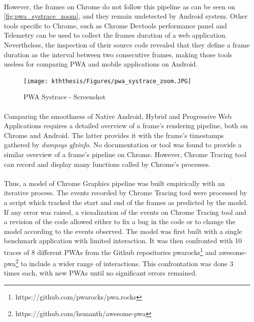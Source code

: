 \documentclass{kththesis}
\begin{document}
    \paragraph{}
    However, the frames on Chrome do not follow this pipeline as can be seen on \autoref{fig:pwa_systrace_zoom}, and they remain undetected by Android system. Other tools specific to Chrome, such as Chrome Devtools performance panel and Telemetry can be used to collect the frames duration of a web application. Nevertheless, the inspection of their source code revealed that they define a frame duration as the interval between two consecutive frames, making those tools useless for comparing PWA and mobile applications on Android.
    
    \begin{figure}
        \centering
        \texttt{[image: kththesis/Figures/pwa\_systrace\_zoom.JPG]}
        \caption{PWA Systrace - Screenshot}
        \label{fig:pwa_systrace_zoom}
    \end{figure}
    
    \paragraph{}
    Comparing the smoothness of Native Android, Hybrid and Progressive Web Applications requires a detailed overview of a frame's rendering pipeline, both on Chrome and Android. The latter provides it with the frame's timestamps gathered by \textit{dumpsys gfxinfo}. No documentation or tool was found to provide a similar overview of a frame's pipeline on Chrome. However, Chrome Tracing tool can record and display many functions called by Chrome's processes.
    
    \paragraph{}
    Thus, a model of Chrome Graphics pipeline was built empirically with an iterative process. The events recorded by Chrome Tracing tool were processed by a script which tracked the start and end of the frames as predicted by the model. If any error was raised, a visualization of the events on Chrome Tracing tool and a revision of the code allowed either to fix a bug in the code or to change the model according to the events observed. \newline
    The model was first built with a single benchmark application with limited interaction. It was then confronted with 10 traces of 8 different PWAs from the Github repositories pwarocks\footnote{https://github.com/pwarocks/pwa.rocks} and awesome-pwa\footnote{https://github.com/hemanth/awesome-pwa} to include a wider range of interactions. This confrontation was done 3 times each, with new PWAs until no significant errors remained.
    
\end{document}
